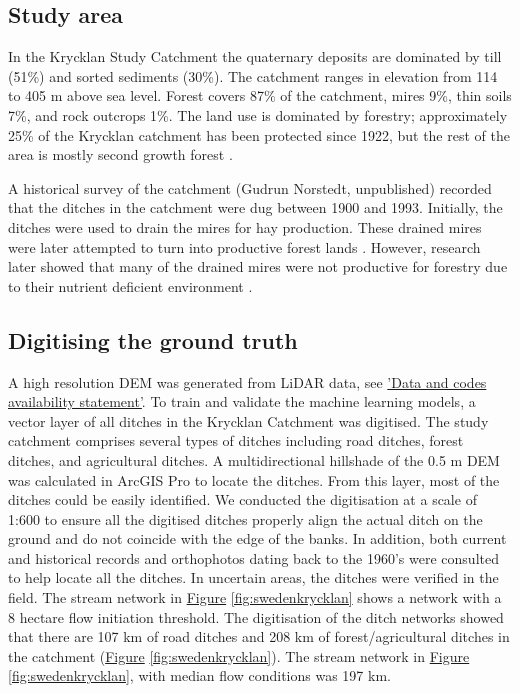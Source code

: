 \documentclass[]{interact}
\theoremstyle{plain}%
\theoremstyle{definition}
\theoremstyle{remark}
\begin{document}
\subsection{Study area}
In the Krycklan Study Catchment the quaternary deposits are dominated by till (51\%) and sorted sediments (30\%). The catchment ranges in elevation from 114 to 405 m above sea level. Forest covers 87\% of the catchment, mires 9\%, thin soils 7\%, and rock outcrops 1\%. The land use is dominated by forestry; approximately 25\% of the Krycklan catchment has been protected since 1922, but  the rest of the area is mostly second growth forest \citep{krycklancatchment}. 

A historical survey of the catchment (Gudrun Norstedt, unpublished) recorded  that the ditches in the catchment were dug between 1900 and 1993. Initially, the ditches were used to drain the mires for hay production. These drained mires were later attempted to turn into productive forest lands \citep{paivanen}. However, research later showed that many of the drained mires were not productive for forestry due to their nutrient deficient environment \citep{sikstrom}.

\subsection{Digitising the ground truth}
A high resolution DEM was generated from LiDAR data, see \hyperref[lidartodem]{'Data and codes availability statement'}. To train and validate the machine learning models, a vector layer of all ditches in the Krycklan Catchment \citep{krycklancatchment} was digitised. The study catchment comprises several types of ditches including road ditches, forest ditches, and agricultural ditches. A multidirectional hillshade of the 0.5 m DEM was calculated in ArcGIS Pro to locate the ditches. From this layer, most of the ditches could be easily identified. We conducted the digitisation at a scale of 1:600 to ensure all the digitised ditches properly align the actual ditch on the ground and do not coincide with the edge of the banks. In addition, both current and historical records and orthophotos dating back to the 1960's were consulted to help locate all the ditches. In uncertain areas, the ditches were verified in the field. The stream network in \hyperref[fig:swedenkrycklan]{Figure} \ref{fig:swedenkrycklan} shows a network with a 8 hectare flow initiation threshold. The digitisation of the ditch networks showed that there are 107 km of road ditches and 208 km of forest/agricultural ditches in the catchment (\hyperref[fig:swedenkrycklan]{Figure} \ref{fig:swedenkrycklan}). The stream network in \hyperref[fig:swedenkrycklan]{Figure} \ref{fig:swedenkrycklan}, with median flow conditions was 197 km.
\end{document}

